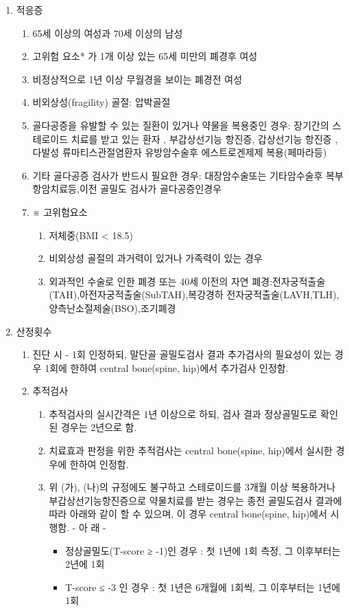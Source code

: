 {\begin{enumerate}[가.]\tightlist
\item 적응증
	\begin{enumerate}[(1)]\tightlist
	\item 65세 이상의 여성과 70세 이상의 남성
	\item 고위험 요소* 가 1개 이상 있는 65세 미만의 폐경후 여성
	\item 비정상적으로 1년 이상 무월경을 보이는 폐경전 여성
	\item 비외상성(fragility) 골절: 압박골절 
	\item 골다공증을 유발할 수 있는 질환이 있거나 약물을 복용중인 경우: 장기간의 스테로이드 치료를 받고 있는 환자 , 부갑상선기능 항진증, 갑상선기능 항진증 , 다발성 류마티스관절염환자  유방암수술후 에스트로겐제제 복용(페마라등)
	\item 기타 골다공증 검사가 반드시 필요한 경우: 대장암수술또는 기타암수술후 복부 항암치료등,이전 골밀도 검사가 골다공증인경우
    \item ※ 고위험요소
		\begin{enumerate}[1.]\tightlist
		\item 저체중(BMI < 18.5)
		\item 비외상성 골절의 과거력이 있거나 가족력이 있는 경우
		\item 외과적인 수술로 인한 폐경 또는 40세 이전의 자연 폐경:전자궁적출술(TAH),아전자궁적출술(SubTAH),복강경하 전자궁적출술(LAVH,TLH),양측난소절제술(BSO),조기폐경
		\end{enumerate}
	\end{enumerate}	
\item 산정횟수
    \begin{enumerate}[(1)]\tightlist
	\item 진단 시
         - 1회 인정하되, 말단골 골밀도검사 결과 추가검사의 필요성이 있는 경우 1회에 한하여 central bone(spine, hip)에서 추가검사 인정함.
	\item 추적검사
		\begin{enumerate}[(가)]\tightlist
		\item 추적검사의 실시간격은 1년 이상으로 하되, 검사 결과 정상골밀도로 확인된 경우는 2년으로 함.
		\item 치료효과 판정을 위한 추적검사는 central bone(spine, hip)에서 실시한 경우에 한하여 인정함.             
		\item 위 (가), (나)의 규정에도 불구하고 스테로이드를 3개월 이상 복용하거나 부갑상선기능항진증으로 약물치료를 받는 경우는 종전 골밀도검사 결과에 따라 아래와 같이 할 수 있으며, 이 경우 central bone(spine, hip)에서 시행함.\newline
         - 아    래 -
			\begin{itemize}[●]\tightlist
			\item 정상골밀도(T-score ≥ -1)인 경우
            : 첫 1년에 1회 측정, 그 이후부터는 2년에 1회
			\item T-score ≤ -3 인 경우
            : 첫 1년은 6개월에 1회씩, 그 이후부터는 1년에 1회
			\end{itemize}
		\end{enumerate}
	\end{enumerate}	
\end{enumerate}
}

